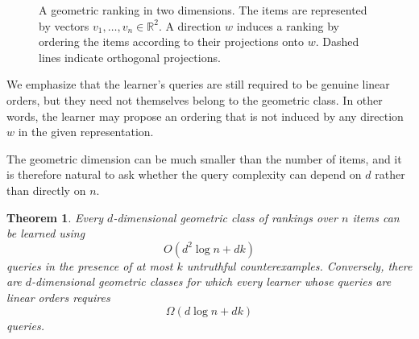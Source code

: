 \documentclass[11pt]{article}
\newtheorem{theorem}{Theorem}[section]
\theoremstyle{definition}
\theoremstyle{remark}
\begin{document}
\begin{figure}[t]

\caption{
A geometric ranking in two dimensions.
The items are represented by vectors
$v_1,\ldots,v_n\in\mathbb{R}^2$.
A direction $w$ induces a ranking by ordering the items according to
their projections onto $w$.
Dashed lines indicate orthogonal projections.
}
\label{fig:geometric-ranking}
\end{figure}
We emphasize that the learner's queries are still required to be genuine
linear orders, but they need not themselves belong to the geometric class.
In other words, the learner may propose an ordering that is not induced by
any direction $w$ in the given representation.

The geometric dimension can be much smaller than the number of items, and it
is therefore natural to ask whether the query complexity can depend on $d$
rather than directly on $n$.
\begin{theorem}
Every $d$-dimensional geometric class of rankings over $n$ items can be
learned using
\[
    O(d^2\log n+dk)
\]
queries in the presence of at most $k$ untruthful counterexamples.
Conversely, there are $d$-dimensional geometric classes for which every
learner whose queries are linear orders requires
\[
    \Omega(d\log n+dk)
\]
queries.
\end{theorem}
\end{document}
